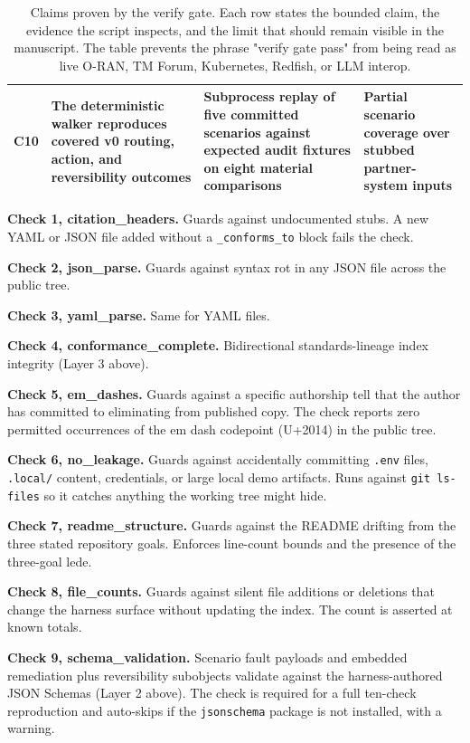 \documentclass[twocolumn,10pt,a4paper]{article}
\begin{document}
\begin{table}[t]
\begin{tabularx}{\textwidth}{p{1.2cm}X X X}
C10 & The deterministic walker reproduces covered v0 routing, action, and reversibility outcomes & Subprocess replay of five committed scenarios against expected audit fixtures on eight material comparisons & Partial scenario coverage over stubbed partner-system inputs \\
\bottomrule
\end{tabularx}
\caption{Claims proven by the verify gate. Each row states the bounded claim, the evidence the script inspects, and the limit that should remain visible in the manuscript. The table prevents the phrase "verify gate pass" from being read as live O-RAN, TM Forum, Kubernetes, Redfish, or LLM interop.}
\label{tab:verify-claims}
\end{table}

\textbf{Check 1, citation\_headers.} Guards against undocumented stubs. A new YAML or JSON file added without a \texttt{\_conforms\_to} block fails the check.

\textbf{Check 2, json\_parse.} Guards against syntax rot in any JSON file across the public tree.

\textbf{Check 3, yaml\_parse.} Same for YAML files.

\textbf{Check 4, conformance\_complete.} Bidirectional standards-lineage index integrity (Layer 3 above).

\textbf{Check 5, em\_dashes.} Guards against a specific authorship tell that the author has committed to eliminating from published copy. The check reports zero permitted occurrences of the em dash codepoint (U+2014) in the public tree.

\textbf{Check 6, no\_leakage.} Guards against accidentally committing \texttt{.env} files, \texttt{.local/} content, credentials, or large local demo artifacts. Runs against \texttt{git ls-files} so it catches anything the working tree might hide.

\textbf{Check 7, readme\_structure.} Guards against the README drifting from the three stated repository goals. Enforces line-count bounds and the presence of the three-goal lede.

\textbf{Check 8, file\_counts.} Guards against silent file additions or deletions that change the harness surface without updating the index. The count is asserted at known totals.

\textbf{Check 9, schema\_validation.} Scenario fault payloads and embedded remediation plus reversibility subobjects validate against the harness-authored JSON Schemas (Layer 2 above). The check is required for a full ten-check reproduction and auto-skips if the \texttt{jsonschema} package is not installed, with a warning.
\end{document}
